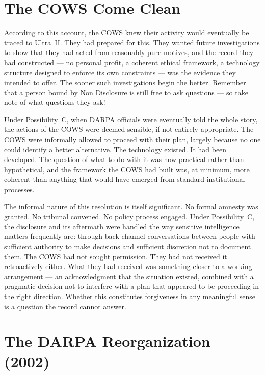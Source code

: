 \section*{The COWS Come Clean}
\label{record:int-the-cows-come-clean}

According to this account, the COWS knew their activity would eventually be traced to Ultra~II\@. They had prepared for this. They wanted future investigations to show that they had acted from reasonably pure motives, and the record they had constructed --- no personal profit, a coherent ethical framework, a technology structure designed to enforce its own constraints --- was the evidence they intended to offer. The sooner such investigations begin the better. Remember that a person bound by Non Disclosure is still free to ask questions --- so take note of what questions they ask!

Under Possibility~C, when DARPA officials were eventually told the whole story, the actions of the COWS were deemed sensible, if not entirely appropriate. The COWS were informally allowed to proceed with their plan, largely because no one could identify a better alternative. The technology existed. It had been developed. The question of what to do with it was now practical rather than hypothetical, and the framework the COWS had built was, at minimum, more coherent than anything that would have emerged from standard institutional processes.

The informal nature of this resolution is itself significant. No formal amnesty was granted. No tribunal convened. No policy process engaged. Under Possibility~C, the disclosure and its aftermath were handled the way sensitive intelligence matters frequently are: through back-channel conversations between people with sufficient authority to make decisions and sufficient discretion not to document them. The COWS had not sought permission. They had not received it retroactively either. What they had received was something closer to a working arrangement --- an acknowledgment that the situation existed, combined with a pragmatic decision not to interfere with a plan that appeared to be proceeding in the right direction. Whether this constitutes forgiveness in any meaningful sense is a question the record cannot answer.

\section*{The DARPA Reorganization (2002)}
\label{record:int-the-darpa-reorganization-2002}

